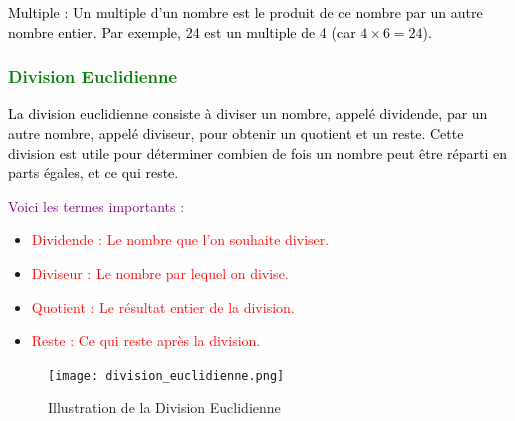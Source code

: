 \documentclass{article}
\begin{document}
\begin{tcolorbox}[colback=cyan!10!white, colframe=red!75!black, title=\textcolor{white}{Définition},
                  sharp corners=southwest]
                  
\textcolor{black}{Multiple : Un multiple d'un nombre est le produit de ce nombre par un autre nombre entier. Par exemple, 24 est un multiple de 4 (car \(4 \times 6 = 24\)).}
\end{tcolorbox}

\subsubsection{\textcolor{green}{Division Euclidienne}}

\vspace{0.5cm}

\begin{tcolorbox}[colback=cyan!10!white, colframe=red!75!black, title=\textcolor{white}{Définition}, 
                  sharp corners=southwest]

\textcolor{black}{La division euclidienne consiste à diviser un nombre, appelé dividende, par un autre nombre, appelé diviseur, pour obtenir un quotient et un reste. Cette division est utile pour déterminer combien de fois un nombre peut être réparti en parts égales, et ce qui reste.}
\end{tcolorbox}

\vspace{0.5cm}

\textcolor{purple}{Voici les termes importants :}
\begin{itemize}
    \item \textcolor{red}{Dividende : Le nombre que l'on souhaite diviser.}
    \item \textcolor{red}{Diviseur : Le nombre par lequel on divise.}
    \item \textcolor{red}{Quotient : Le résultat entier de la division.}
    \item \textcolor{red}{Reste : Ce qui reste après la division.}
\end{itemize}


\begin{figure}[H]
    \centering
    \texttt{[image: division\_euclidienne.png]}
    \caption{Illustration de la Division Euclidienne}
    \label{fig:enter-label}
\end{figure}

\vspace{0.1cm}
\end{document}
